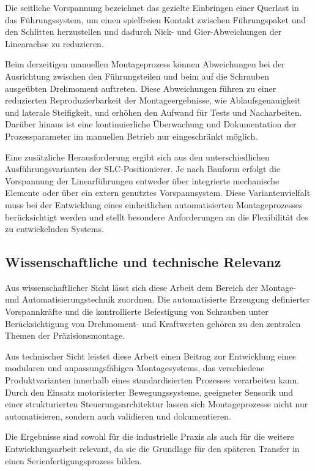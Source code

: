 Die seitliche Vorspannung bezeichnet das gezielte Einbringen einer Querlast in das Führungssystem, um einen spielfreien Kontakt zwischen Führungspaket und den Schlitten herzustellen und dadurch Nick- und Gier-Abweichungen der Linearachse zu reduzieren.

Beim derzeitigen manuellen Montageprozess können Abweichungen bei der Ausrichtung zwischen den Führungsteilen und beim auf die Schrauben ausgeübten Drehmoment auftreten. Diese Abweichungen führen zu einer reduzierten Reproduzierbarkeit der Montageergebnisse, wie Ablaufsgenauigkeit und laterale Steifigkeit, und erhöhen den Aufwand für Tests und Nacharbeiten. Darüber hinaus ist eine kontinuierliche Überwachung und Dokumentation der Prozessparameter im manuellen Betrieb nur eingeschränkt möglich.\cite{Groover_Automation}

Eine zusätzliche Herausforderung ergibt sich aus den unterschiedlichen Ausführungsvarianten der SLC-Positionierer. Je nach Bauform erfolgt die Vorspannung der Linearführungen entweder über integrierte mechanische Elemente oder über ein extern genutztes Vorspannsystem. Diese Variantenvielfalt muss bei der Entwicklung eines einheitlichen automatisierten Montageprozesses berücksichtigt werden und stellt besondere Anforderungen an die Flexibilität des zu entwickelnden Systems.

\subsection{Wissenschaftliche und technische Relevanz}
Aus wissenschaftlicher Sicht lässt sich diese Arbeit dem Bereich der Montage- und Automatisierungstechnik zuordnen. Die automatisierte Erzeugung definierter Vorspannkräfte und die kontrollierte Befestigung von Schrauben unter Berücksichtigung von Drehmoment- und Kraftwerten gehören zu den zentralen Themen der Präzisionsmontage.\cite{Lotter_Montage,Groover_Automation}

Aus technischer Sicht leistet diese Arbeit einen Beitrag zur Entwicklung eines modularen und anpassungsfähigen Montagesystems, das verschiedene Produktvarianten innerhalb eines standardisierten Prozesses verarbeiten kann. Durch den Einsatz motorisierter Bewegungssysteme, geeigneter Sensorik und einer strukturierten Steuerungsarchitektur lassen sich Montageprozesse nicht nur automatisieren, sondern auch validieren und dokumentieren.\cite{Kagermann_I40}

Die Ergebnisse sind sowohl für die industrielle Praxis als auch für die weitere Entwicklungsarbeit relevant, da sie die Grundlage für den späteren Transfer in einen Serienfertigungsprozess bilden.

